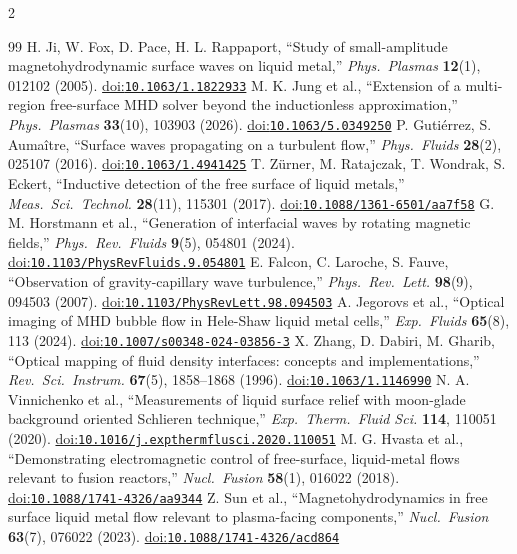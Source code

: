\documentclass[10pt,letterpaper]{article}
\newcommand{\doi}[1]{\href{https://doi.org/#1}{doi:\nolinkurl{#1}}}
\begin{document}
\vspace{-2pt}
\begin{multicols}{2}
\footnotesize
\setlength{\columnsep}{14pt}
\renewcommand{\refname}{\normalsize References}
\begin{thebibliography}{99}
\setlength{\itemsep}{0pt}\setlength{\parskip}{0pt}
 H. Ji, W. Fox, D. Pace, H. L. Rappaport, ``Study of small-amplitude magnetohydrodynamic surface waves on liquid metal,'' \emph{Phys.\ Plasmas} \textbf{12}(1), 012102 (2005). \doi{10.1063/1.1822933}
 M. K. Jung et al., ``Extension of a multi-region free-surface MHD solver beyond the inductionless approximation,'' \emph{Phys.\ Plasmas} \textbf{33}(10), 103903 (2026). \doi{10.1063/5.0349250}
 P. Gutiérrez, S. Aumaître, ``Surface waves propagating on a turbulent flow,'' \emph{Phys.\ Fluids} \textbf{28}(2), 025107 (2016). \doi{10.1063/1.4941425}
 T. Zürner, M. Ratajczak, T. Wondrak, S. Eckert, ``Inductive detection of the free surface of liquid metals,'' \emph{Meas.\ Sci.\ Technol.} \textbf{28}(11), 115301 (2017). \doi{10.1088/1361-6501/aa7f58}
 G. M. Horstmann et al., ``Generation of interfacial waves by rotating magnetic fields,'' \emph{Phys.\ Rev.\ Fluids} \textbf{9}(5), 054801 (2024). \doi{10.1103/PhysRevFluids.9.054801}
 E. Falcon, C. Laroche, S. Fauve, ``Observation of gravity-capillary wave turbulence,'' \emph{Phys.\ Rev.\ Lett.} \textbf{98}(9), 094503 (2007). \doi{10.1103/PhysRevLett.98.094503}
 A. Jegorovs et al., ``Optical imaging of MHD bubble flow in Hele-Shaw liquid metal cells,'' \emph{Exp.\ Fluids} \textbf{65}(8), 113 (2024). \doi{10.1007/s00348-024-03856-3}
 X. Zhang, D. Dabiri, M. Gharib, ``Optical mapping of fluid density interfaces: concepts and implementations,'' \emph{Rev.\ Sci.\ Instrum.} \textbf{67}(5), 1858--1868 (1996). \doi{10.1063/1.1146990}
 N. A. Vinnichenko et al., ``Measurements of liquid surface relief with moon-glade background oriented Schlieren technique,'' \emph{Exp.\ Therm.\ Fluid Sci.} \textbf{114}, 110051 (2020). \doi{10.1016/j.expthermflusci.2020.110051}
 M. G. Hvasta et al., ``Demonstrating electromagnetic control of free-surface, liquid-metal flows relevant to fusion reactors,'' \emph{Nucl.\ Fusion} \textbf{58}(1), 016022 (2018). \doi{10.1088/1741-4326/aa9344}
 Z. Sun et al., ``Magnetohydrodynamics in free surface liquid metal flow relevant to plasma-facing components,'' \emph{Nucl.\ Fusion} \textbf{63}(7), 076022 (2023). \doi{10.1088/1741-4326/acd864}

\end{thebibliography}
\end{multicols}
\end{document}
